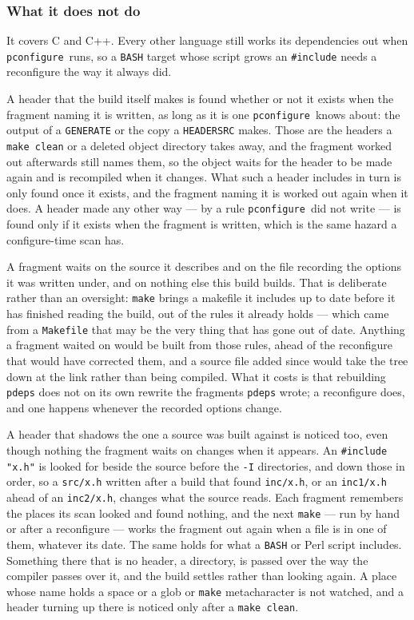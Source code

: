 \documentclass{article}
\newcommand{\pconfigure}{\texttt{pconfigure}}
\begin{document}
\subsubsection{What it does not do}

It covers C and C++.  Every other language still works its
dependencies out when \pconfigure\ runs, so a \texttt{BASH} target
whose script grows an \texttt{\#include} needs a reconfigure the way it
always did.

A header that the build itself makes is found whether or not it
exists when the fragment naming it is written, as long as it is one
\pconfigure\ knows about: the output of a \texttt{GENERATE} or the
copy a \texttt{HEADERSRC} makes.  Those are the headers a
\texttt{make clean} or a deleted object directory takes away, and the
fragment worked out afterwards still names them, so the object waits
for the header to be made again and is recompiled when it changes.
What such a header includes in turn is only found once it exists, and
the fragment naming it is worked out again when it does.  A header
made any other way --- by a rule \pconfigure\ did not write --- is
found only if it exists when the fragment is written, which is the
same hazard a configure-time scan has.

A fragment waits on the source it describes and on the file recording
the options it was written under, and on nothing else this build
builds.  That is deliberate rather than an oversight: \texttt{make}
brings a makefile it includes up to date before it has finished
reading the build, out of the rules it already holds --- which came
from a \texttt{Makefile} that may be the very thing that has gone out
of date.  Anything a fragment waited on would be built from those
rules, ahead of the reconfigure that would have corrected them, and a
source file added since would take the tree down at the link rather
than being compiled.  What it costs is that rebuilding \texttt{pdeps}
does not on its own rewrite the fragments \texttt{pdeps} wrote; a
reconfigure does, and one happens whenever the recorded options
change.

A header that shadows the one a source was built against is noticed
too, even though nothing the fragment waits on changes when it
appears.  An \texttt{\#include "x.h"} is looked for beside the source
before the \texttt{-I} directories, and down those in order, so a
\texttt{src/x.h} written after a build that found \texttt{inc/x.h},
or an \texttt{inc1/x.h} ahead of an \texttt{inc2/x.h}, changes what
the source reads.  Each fragment remembers the places its scan looked
and found nothing, and the next \texttt{make} --- run by hand or
after a reconfigure --- works the fragment out again when a file is
in one of them, whatever its date.  The same holds for what a
\texttt{BASH} or Perl script includes.  Something there that is no
header, a directory, is passed over the way the compiler passes over
it, and the build settles rather than looking again.  A place whose
name holds a space or a glob or \texttt{make} metacharacter is not
watched, and a header turning up there is noticed only after a
\texttt{make clean}.
\end{document}
